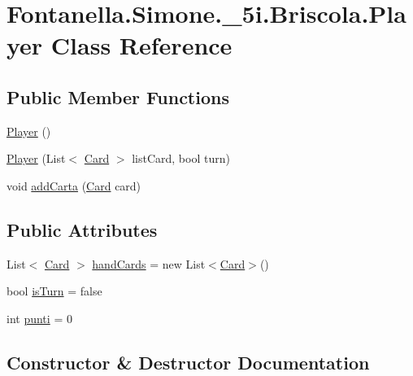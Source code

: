 \hypertarget{class_fontanella_1_1_simone_1_1__5i_1_1_briscola_1_1_player}{}\section{Fontanella.\+Simone.\+\_\+5i.\+Briscola.\+Player Class Reference}
\label{class_fontanella_1_1_simone_1_1__5i_1_1_briscola_1_1_player}
\subsection*{Public Member Functions}
\begin{DoxyCompactItemize}
\item 
\hyperlink{class_fontanella_1_1_simone_1_1__5i_1_1_briscola_1_1_player_aa805663430170d74db67e3f900c14715}{Player} ()
\item 
\hyperlink{class_fontanella_1_1_simone_1_1__5i_1_1_briscola_1_1_player_aef3390197ac09b8e799c3144c0a33bb6}{Player} (List$<$ \hyperlink{class_fontanella_1_1_simone_1_1__5i_1_1_briscola_1_1_card}{Card} $>$ list\+Card, bool turn)
\item 
void \hyperlink{class_fontanella_1_1_simone_1_1__5i_1_1_briscola_1_1_player_ac4efbc7a4c7809d9a54cefdba76cf771}{add\+Carta} (\hyperlink{class_fontanella_1_1_simone_1_1__5i_1_1_briscola_1_1_card}{Card} card)
\end{DoxyCompactItemize}
\subsection*{Public Attributes}
\begin{DoxyCompactItemize}
\item 
List$<$ \hyperlink{class_fontanella_1_1_simone_1_1__5i_1_1_briscola_1_1_card}{Card} $>$ \hyperlink{class_fontanella_1_1_simone_1_1__5i_1_1_briscola_1_1_player_aea76897ad4738640a6d4a06c553a4453}{hand\+Cards} = new List$<$\hyperlink{class_fontanella_1_1_simone_1_1__5i_1_1_briscola_1_1_card}{Card}$>$()
\item 
bool \hyperlink{class_fontanella_1_1_simone_1_1__5i_1_1_briscola_1_1_player_ad2b525444ebc7aa1baeff6aee7020ad0}{is\+Turn} = false
\item 
int \hyperlink{class_fontanella_1_1_simone_1_1__5i_1_1_briscola_1_1_player_aa67dff030186e73f9e6ca595db566793}{punti} = 0
\end{DoxyCompactItemize}


\subsection{Constructor \& Destructor Documentation}
\hypertarget{class_fontanella_1_1_simone_1_1__5i_1_1_briscola_1_1_player_aa805663430170d74db67e3f900c14715}{}\label{class_fontanella_1_1_simone_1_1__5i_1_1_briscola_1_1_player_aa805663430170d74db67e3f900c14715} 
